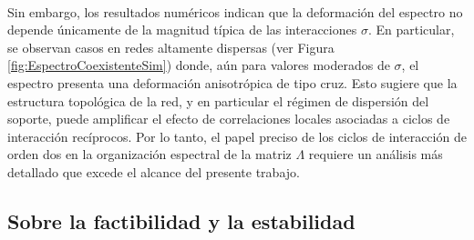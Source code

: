 \\
Sin embargo, los resultados numéricos indican que la deformación del espectro no depende únicamente de la magnitud típica de las interacciones $\sigma$. En particular, se observan casos en redes altamente dispersas (ver Figura \eqref{fig:EspectroCoexistenteSim}) donde, aún para valores moderados de $\sigma$, el espectro presenta una deformación anisotrópica de tipo cruz. Esto sugiere que la estructura topológica de la red, y en particular el régimen de dispersión del soporte, puede amplificar el efecto de correlaciones locales asociadas a ciclos de interacción recíprocos. Por lo tanto, el papel preciso de los ciclos de interacción de orden dos en la organización espectral de la matriz $\Lambda$ requiere un análisis más detallado que excede el alcance del presente trabajo.

\subsection{Sobre la factibilidad y la estabilidad}

